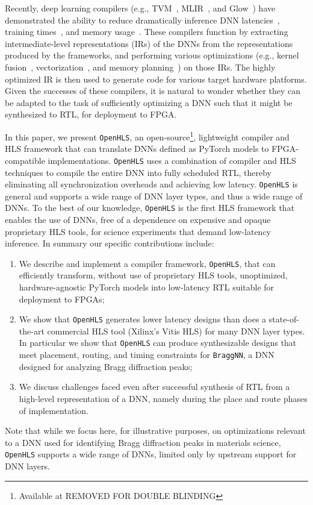 \documentclass[10pt]{sig-alternate}
\begin{document}
Recently, deep learning compilers (e.g., TVM~\cite{chen2018tvm},
MLIR~\cite{https://doi.org/10.48550/arxiv.2002.11054}, and Glow~\cite{https://doi.org/10.48550/arxiv.1805.00907})
have demonstrated the ability to reduce dramatically inference DNN latencies~\cite{https://doi.org/10.48550/arxiv.1809.02697}, training times~\cite{9664259}, and memory usage~\cite{https://doi.org/10.48550/arxiv.1604.06174}. These compilers function by extracting intermediate-level
representations (IRs) of the DNNs from the representations produced
by the frameworks, and performing various optimizations
(e.g., kernel fusion~\cite{10.1145/2858788.2688521}, vectorization~\cite{maleki2011evaluation}, and memory planning~\cite{https://doi.org/10.48550/arxiv.1604.06174}) on those IRs.
The highly optimized IR is then used to generate code for various
target hardware platforms. Given the successes of these compilers,
it is natural to wonder whether they can be adapted to the task of
sufficiently optimizing a DNN such that it might be synthesized to
RTL, for deployment to FPGA.

In this paper, we present \texttt{OpenHLS}, an open-source\footnote{Available
at REMOVED FOR DOUBLE BLINDING}, lightweight
compiler and HLS framework that can translate DNNs defined as PyTorch
models to FPGA-compatible implementations. \texttt{OpenHLS} uses
a combination of compiler and HLS techniques to compile the entire
DNN into fully scheduled RTL, thereby eliminating all synchronization
overheads and achieving low latency. \texttt{OpenHLS} is general
and supports a wide range of DNN layer types, and thus a wide range of DNNs.
To the best of our knowledge, \texttt{OpenHLS} is the first HLS framework that enables the use of DNNs, free of a dependence on expensive and opaque proprietary HLS tools, for science experiments that demand low-latency inference.
In summary our
specific contributions include:
\begin{enumerate}
\item We describe and implement a compiler framework, \texttt{OpenHLS}, that can efficiently transform, without use of proprietary HLS tools, unoptimized, hardware-agnostic PyTorch models into low-latency RTL suitable for deployment to FPGAs;
\item We show that \texttt{OpenHLS} generates lower latency designs than does a state-of-the-art commercial HLS tool (Xilinx's Vitis
HLS) for many DNN layer types. In particular we show that
\texttt{OpenHLS} can produce synthesizable designs that meet placement,
routing, and timing constraints for \texttt{BraggNN}, a DNN designed for analyzing Bragg diffraction peaks;
\item We discuss challenges faced even after successful synthesis
of RTL from a high-level representation of a DNN, namely during the
place and route phases of implementation.
\end{enumerate}
Note that while we focus here, for illustrative purposes, on  optimizations relevant to a DNN used for identifying Bragg diffraction peaks in materials science,
\texttt{OpenHLS} supports a wide range of DNNs, limited only by upstream support for DNN layers.
\end{document}

